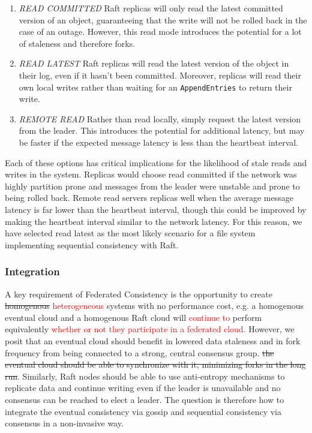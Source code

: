 \documentclass{article}
\newcommand{\pete}[1]{\textcolor{red}{#1}}
\newcommand{\change}[2]{\sout{#1} \textcolor{red}{#2}}
\begin{document}
\begin{enumerate}
    \item \textit{READ COMMITTED} Raft replicas will only read the latest committed version of an object, guaranteeing that the write will not be rolled back in the case of an outage. However, this read mode introduces the potential for a lot of staleness and therefore forks.
    \item \textit{READ LATEST} Raft replicas will read the latest version of the object in their log, even if it hasn't been committed. Moreover, replicas will read their own local writes rather than waiting for an \texttt{AppendEntries} to return their write.
    \item \textit{REMOTE READ} Rather than read locally, simply request the latest version from the leader. This introduces the potential for additional latency, but may be faster if the expected message latency is less than the heartbeat interval.
\end{enumerate}

Each of these options has critical implications for the likelihood of stale reads and writes in the system. Replicas would choose read committed if the network was highly partition prone and messages from the leader were unstable and prone to being rolled back. Remote read servers replicas well when the average message latency is far lower than the heartbeat interval, though this could be improved by making the heartbeat interval similar to the network latency. For this reason, we have selected read latest as the most likely scenario for a file system implementing sequential consistency with Raft.

\subsubsection{Integration}

A key requirement of Federated Consistency is the opportunity to create \change{homogenous}{heterogeneous} systems with no performance cost, e.g. a homogenous eventual cloud and a homogenous Raft cloud will \pete{continue to} perform equivalently \pete{whether or not they participate in a federated cloud.} However, we posit that an eventual cloud should benefit in lowered data staleness and in fork frequency from being connected to a strong, central consensus group. \sout{the eventual cloud should be able to synchronize with it, minimizing forks in the long run}. Similarly, Raft nodes should be able to use anti-entropy mechanisms to replicate data and continue writing even if the leader is unavailable and no consensus can be reached to elect a leader. The question is therefore how to integrate the eventual consistency via gossip and sequential consistency via consensus in a non-invasive way.
\end{document}
